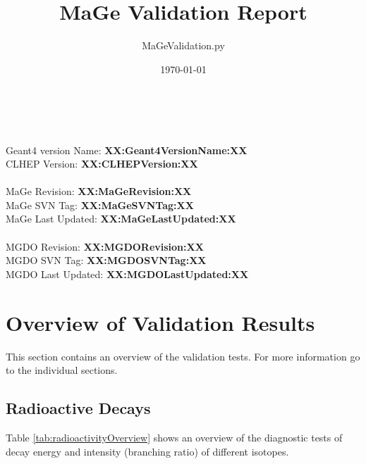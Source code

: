 \documentclass[pdftex, a4paper, 12pt,pointlessnumbers]{scrartcl} %
\title{MaGe Validation Report}
\author{MaGeValidation.py}
\date{\today}
\begin{document}
 
\maketitle

~\\
~\\
Geant4 version Name: \textbf{XX:Geant4VersionName:XX}\\
CLHEP Version: \textbf{XX:CLHEPVersion:XX}\\
~\\
MaGe Revision: \textbf{XX:MaGeRevision:XX}\\
MaGe SVN Tag: \textbf{XX:MaGeSVNTag:XX}\\
MaGe Last Updated: \textbf{XX:MaGeLastUpdated:XX}\\
~\\
MGDO Revision: \textbf{XX:MGDORevision:XX}\\
MGDO SVN Tag: \textbf{XX:MGDOSVNTag:XX}\\
MGDO Last Updated: \textbf{XX:MGDOLastUpdated:XX}\\

\newpage

\tableofcontents

\newpage

\section{Overview of Validation Results}

This section contains an overview of the validation tests. For more information go to the individual sections.

\subsection{Radioactive Decays}

Table \ref{tab:radioactivityOverview} shows an overview of the diagnostic tests of decay energy and intensity (branching ratio) of different isotopes.
\end{document}
